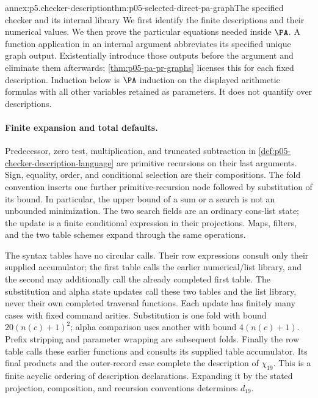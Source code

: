 \begin{annexitem}{annex:p5.checker-description}{thm:p05-selected-direct-pa-graph}{The specified checker and its internal library}
We first identify the finite descriptions and their numerical values.  We
then prove the particular equations needed inside \(\PA\).  A function
application in an internal argument abbreviates its specified unique graph
output.  Existentially introduce those outputs before the argument and
eliminate them afterwards; \cref{thm:p05-pa-pr-graphs} licenses this for
each fixed description.  Induction below is \(\PA\) induction on the
displayed arithmetic formulas with all other variables retained as parameters.
It does not quantify over descriptions.

\paragraph{Finite expansion and total defaults.}
Predecessor, zero test, multiplication, and truncated subtraction in
\cref{def:p05-checker-description-language} are primitive recursions on their
last arguments.  Sign, equality, order, and conditional selection are their
compositions.  The fold convention inserts one further primitive-recursion
node followed by substitution of its bound.  In particular, the upper bound
of a sum or a search is not an unbounded minimization.  The two search fields
are an ordinary cons-list state; the update is a finite conditional expression
in their projections.  Maps, filters, and the two table schemes expand through
the same operations.

The syntax tables have no circular calls.  Their row expressions consult only
their supplied accumulator; the first table calls the earlier numerical/list
library, and the second may additionally call the already completed first
table.  The substitution and alpha state updates call these two tables and
the list library, never their own completed traversal functions.  Each update
has finitely many cases with fixed command arities.  Substitution is one fold
with bound \(20(n(c)+1)^2\); alpha comparison uses another with bound
\(4(n(c)+1)\).  Prefix stripping and parameter wrapping are subsequent
folds.  Finally the row table calls these earlier functions and consults its
supplied table accumulator.  Its final products and the outer-record case
complete the description of \(\chi_{19}\).  This is a finite acyclic
ordering of description declarations.  Expanding it by the stated projection,
composition, and recursion conventions determines \(d_{19}\).


\end{annexitem}
